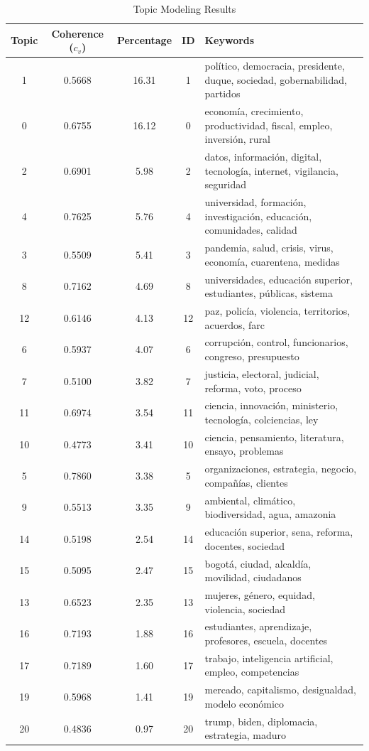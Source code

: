 \documentclass[11pt,                                                            
 superscriptaddress,twoside,
 amsmath,amssymb,
 aps, physrev
]{revtex4-2}
\begin{document}
\begin{table}[H]
	\centering
	\caption{Topic Modeling Results}
	\label{tab:topic_modeling_results}
	\begin{tabular}{ccccp{9cm}}
		\hline
		\textbf{Topic} & \textbf{Coherence ($c_v$)} & \textbf{Percentage} & \textbf{ID} & \textbf{Keywords} \\
		\hline
		1  & 0.5668 & 16.31 & 1  & político, democracia, presidente, duque, sociedad, gobernabilidad, partidos \\
		0  & 0.6755 & 16.12 & 0  & economía, crecimiento, productividad, fiscal, empleo, inversión, rural \\
		2  & 0.6901 & 5.98  & 2  & datos, información, digital, tecnología, internet, vigilancia, seguridad \\
		4  & 0.7625 & 5.76  & 4  & universidad, formación, investigación, educación, comunidades, calidad \\
		3  & 0.5509 & 5.41  & 3  & pandemia, salud, crisis, virus, economía, cuarentena, medidas \\
		8  & 0.7162 & 4.69  & 8  & universidades, educación superior, estudiantes, públicas, sistema \\
		12 & 0.6146 & 4.13  & 12 & paz, policía, violencia, territorios, acuerdos, farc \\
		6  & 0.5937 & 4.07  & 6  & corrupción, control, funcionarios, congreso, presupuesto \\
		7  & 0.5100 & 3.82  & 7  & justicia, electoral, judicial, reforma, voto, proceso \\
		11 & 0.6974 & 3.54  & 11 & ciencia, innovación, ministerio, tecnología, colciencias, ley \\
		10 & 0.4773 & 3.41  & 10 & ciencia, pensamiento, literatura, ensayo, problemas \\
		5  & 0.7860 & 3.38  & 5  & organizaciones, estrategia, negocio, compañías, clientes \\
		9  & 0.5513 & 3.35  & 9  & ambiental, climático, biodiversidad, agua, amazonia \\
		14 & 0.5198 & 2.54  & 14 & educación superior, sena, reforma, docentes, sociedad \\
		15 & 0.5095 & 2.47  & 15 & bogotá, ciudad, alcaldía, movilidad, ciudadanos \\
		13 & 0.6523 & 2.35  & 13 & mujeres, género, equidad, violencia, sociedad \\
		16 & 0.7193 & 1.88  & 16 & estudiantes, aprendizaje, profesores, escuela, docentes \\
		17 & 0.7189 & 1.60  & 17 & trabajo, inteligencia artificial, empleo, competencias \\
		19 & 0.5968 & 1.41  & 19 & mercado, capitalismo, desigualdad, modelo económico \\
		20 & 0.4836 & 0.97  & 20 & trump, biden, diplomacia, estrategia, maduro \\
		\hline
	\end{tabular}
\end{table}
\end{document}
